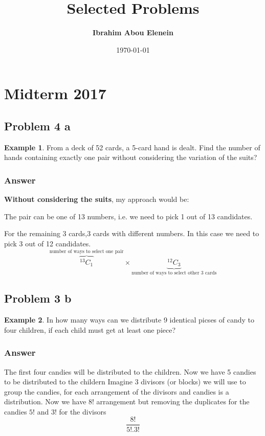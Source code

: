 \documentclass[12pt]{article}
\title{\textbf{Selected Problems}} %
\author{\textbf{Ibrahim Abou Elenein}}
\date{\today} %
\theoremstyle{definition}
\newtheorem{exmp}{Example}[section]
\newcommand*{\Comb}[2]{{}^{#1}C_{#2}}%
\begin{document}
\setlength{\droptitle}{-5em}    
\maketitle
\section{Midterm  2017} 
\subsection{Problem 4 a}
\begin{exmp}
    From a deck of 52 cards, a 5-card hand is dealt. Find the number of
    hands containing exactly one pair without considering the variation
    of the suits?

    \subsubsection{Answer}
    \textbf{Without considering the suits}, my approach would be:

    The pair can be one of 13 numbers, i.e. we need to pick 1 out of 13 candidates.

    For the remaining 3 cards,3 cards with different numbers. In this case we need to pick 3 out of 12 candidates. 
    \[
        \overbrace{\Comb{13}{1}}^{\text{number of ways to select one pair}}
        \times \underbrace{\Comb{12}{3}}_{\text{number of ways to select other 3 cards}}
    \]
\end{exmp}
\subsection{Problem 3 b}
\begin{exmp}
    In how many ways can we distribute 9 identical picses of candy
    to four children, if each child must get at least one piece?
    \subsubsection{Answer}
    The first four candies will be distributed to the children.
    Now we have 5 candies to be distributed to the childern
    Imagine 3 divisors (or blocks) we will use to group the candies,
    for each arrangement of the divisors and candies is a distribution.
    Now we have $8!$ arrangement but removing the duplicates for the
    candies $5!$ and $3!$ for the divisors 
    \[
        \frac{8!}{5!.3!}
    \]
\end{exmp}
\end{document}
